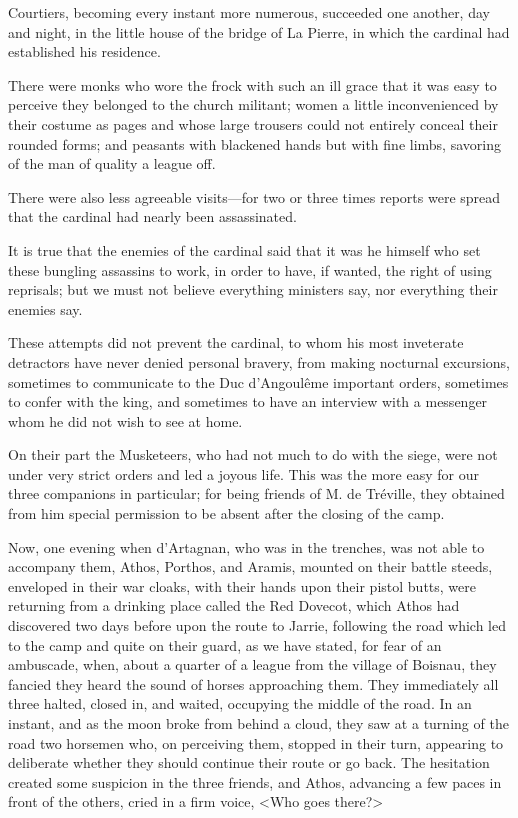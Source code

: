 Courtiers, becoming every instant more numerous, succeeded one another, day and night, in the little house of the bridge of La Pierre, in which the cardinal had established his residence. 

There were monks who wore the frock with such an ill grace that it was easy to perceive they belonged to the church militant; women a little inconvenienced by their costume as pages and whose large trousers could not entirely conceal their rounded forms; and peasants with blackened hands but with fine limbs, savoring of the man of quality a league off. 

There were also less agreeable visits---for two or three times reports were spread that the cardinal had nearly been assassinated. 

It is true that the enemies of the cardinal said that it was he himself who set these bungling assassins to work, in order to have, if wanted, the right of using reprisals; but we must not believe everything ministers say, nor everything their enemies say. 

These attempts did not prevent the cardinal, to whom his most inveterate detractors have never denied personal bravery, from making nocturnal excursions, sometimes to communicate to the Duc d'Angoulême important orders, sometimes to confer with the king, and sometimes to have an interview with a messenger whom he did not wish to see at home. 

On their part the Musketeers, who had not much to do with the siege, were not under very strict orders and led a joyous life. This was the more easy for our three companions in particular; for being friends of M. de Tréville, they obtained from him special permission to be absent after the closing of the camp. 

Now, one evening when d'Artagnan, who was in the trenches, was not able to accompany them, Athos, Porthos, and Aramis, mounted on their battle steeds, enveloped in their war cloaks, with their hands upon their pistol butts, were returning from a drinking place called the Red Dovecot, which Athos had discovered two days before upon the route to Jarrie, following the road which led to the camp and quite on their guard, as we have stated, for fear of an ambuscade, when, about a quarter of a league from the village of Boisnau, they fancied they heard the sound of horses approaching them. They immediately all three halted, closed in, and waited, occupying the middle of the road. In an instant, and as the moon broke from behind a cloud, they saw at a turning of the road two horsemen who, on perceiving them, stopped in their turn, appearing to deliberate whether they should continue their route or go back. The hesitation created some suspicion in the three friends, and Athos, advancing a few paces in front of the others, cried in a firm voice, <Who goes there?> 

